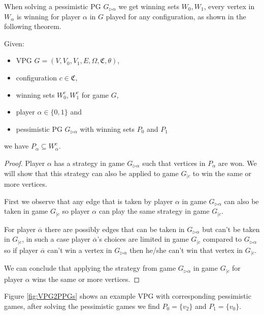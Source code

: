 When solving a pessimistic PG $G_{\triangleright\alpha}$ we get winning sets $W_0,W_1$, every vertex in $W_\alpha$ is winning for player $\alpha$ in $G$ played for any configuration, as shown in the following theorem.
\begin{theorem}
	\label{the_pess_is_winning_for_all_conf}
	Given:
	\begin{itemize}
		\item VPG $G = (V,V_0,V_1,E,\Omega,\mathfrak{C},\theta)$,
		\item configuration $c \in \mathfrak{C}$,
		\item winning sets $W_0^c, W_1^c$ for game $G$,
		\item player $\alpha \in \{0,1\}$ and
		\item pessimistic PG $G_{\triangleright\alpha}$ with winning sets $P_0$ and $P_1$
	\end{itemize}
	we have $P_\alpha \subseteq W_\alpha^c$.
	\begin{proof}
		Player $\alpha$ has a strategy in game $G_{\triangleright\alpha}$ such that vertices in $P_\alpha$ are won. We will show that this strategy can also be applied to game $G_{|c}$ to win the same or more vertices.
		
		First we observe that any edge that is taken by player $\alpha$ in game $G_{\triangleright\alpha}$ can also be taken in game $G_{|c}$ so player $\alpha$ can play the same strategy in game $G_{|c}$.
		
		For player $\overline{\alpha}$ there are possibly edges that can be taken in $G_{\triangleright\alpha}$ but can't be taken in $G_{|c}$, in such a case player $\overline{\alpha}$'s choices are limited in game $G_{|c}$ compared to $G_{\triangleright\alpha}$ so if player $\overline{\alpha}$ can't win a vertex in $G_{\triangleright\alpha}$ then he/she can't win that vertex in $G_{|c}$.
		
		We can conclude that applying the strategy from game $G_{\triangleright\alpha}$ in game $G_{|c}$ for player $\alpha$ wins the same or more vertices.
	\end{proof}
\end{theorem}
Figure \ref{fig:VPG2PPGs} shows an example VPG with corresponding pessimistic games, after solving the pessimistic games we find $P_0 = \{v_2\}$ and $P_1 = \{v_0\}$.
